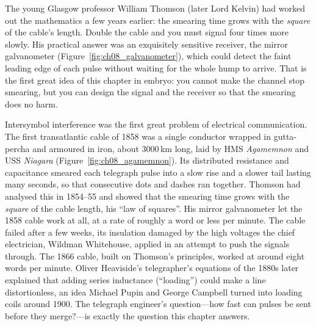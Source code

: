 
The young Glasgow professor William Thomson (later Lord Kelvin) had worked out the
mathematics a few years earlier: the smearing time grows with the \emph{square} of the cable's
length. Double the cable and you must signal four times more slowly. His practical answer
was an exquisitely sensitive receiver, the mirror galvanometer
(Figure~\ref{fig:ch08_galvanometer}), which could detect the faint leading edge of each
pulse without waiting for the whole hump to arrive. That is the first great idea of this
chapter in embryo: you cannot make the channel stop smearing, but you can design the
signal and the receiver so that the smearing does no harm.


\begin{history}
Intersymbol interference was the first great problem of electrical communication. The first
transatlantic cable of 1858 was a single conductor wrapped in gutta-percha and armoured in
iron, about 3000\,km long, laid by HMS \emph{Agamemnon} and USS \emph{Niagara}
(Figure~\ref{fig:ch08_agamemnon}). Its distributed resistance and capacitance smeared each
telegraph pulse into a slow rise and a slower tail lasting many seconds, so that
consecutive dots and dashes ran together. Thomson had analysed this in 1854--55 and showed
that the smearing time grows with the \emph{square} of the cable length, his ``law of
squares''. His mirror galvanometer let the 1858 cable work at all, at a rate of roughly a
word or less per minute. The cable failed after a few weeks, its insulation damaged by the
high voltages the chief electrician, Wildman Whitehouse, applied in an attempt to push the
signals through. The 1866 cable, built on Thomson's principles, worked at around eight words
per minute. Oliver Heaviside's telegrapher's equations of the 1880s later explained that
adding series inductance (``loading'') could make a line distortionless, an idea Michael
Pupin and George Campbell turned into loading coils around 1900. The telegraph engineer's
question---how fast can pulses be sent before they merge?---is exactly the question this
chapter answers.
\end{history}

